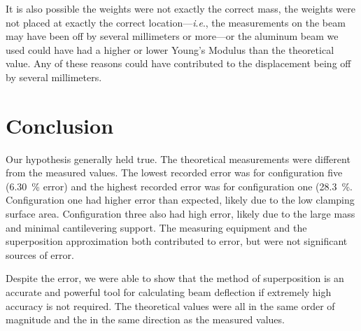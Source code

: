 \documentclass[12 pt]{article}
\newcommand{\ie}{\textit{i}.\textit{e}., }
\begin{document}
It is also possible the weights were not exactly the correct mass, the weights were not placed at exactly the correct location---\ie the measurements on the beam may have been off by several millimeters or more---or the aluminum beam we used could have had a higher or lower Young's Modulus than the theoretical value. Any of these reasons could have contributed to the displacement being off by several millimeters.

\section{Conclusion} \label{conclusion}
Our hypothesis generally held true. The theoretical measurements were different from the measured values. The lowest recorded error was for configuration five (\qty{6.30}{\percent} error) and the highest recorded error was for configuration one (\qty{28.3}{\percent}. Configuration one had higher error than expected, likely due to the low clamping surface area. Configuration three also had high error, likely due to the large mass and minimal cantilevering support. The measuring equipment and the superposition approximation both contributed to error, but were not significant sources of error.

Despite the error, we were able to show that the method of superposition is an accurate and powerful tool for calculating beam deflection if extremely high accuracy is not required. The theoretical values were all in the same order of magnitude and the in the same direction as the measured values.
\end{document}
